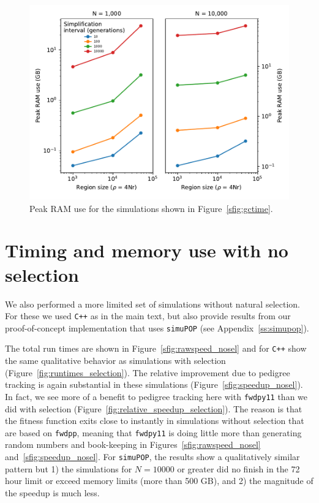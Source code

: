 \documentclass{article}
\newcommand{\simupop}{\texttt{simuPOP}}
\newcommand{\fwdpp}{\texttt{fwdpp}}
\newcommand{\fwdpy}{\texttt{fwdpy11}}
\newcommand{\cpp}{\texttt{C++}}
\begin{document}
\begin{figure}[!h]
    \includegraphics{sims/gc_interval/GCmem}
    \caption{\label{sfig:gcmem}Peak RAM use for the simulations shown in Figure~\ref{sfig:gctime}.}
\end{figure}

\newpage
\section{Timing and memory use with no selection}
\label{ss:timing_nosel}
\renewcommand{\thefigure}{D\arabic{figure}}
\setcounter{figure}{0}

We also performed a more limited set of simulations without natural selection.
For these we used \cpp{} as in the main text, but also provide results from our
proof-of-concept implementation that uses \simupop{} (see
Appendix~\ref{ss:simupop}).

The total run times are shown in
Figure~\ref{sfig:rawspeed_nosel} and for \cpp{} show the same qualitative behavior as simulations with selection
(Figure~\ref{fig:runtimes_selection}).  The relative improvement due to pedigree tracking is again substantial in these
simulations (Figure~\ref{sfig:speedup_nosel}).  In fact, we see more of a benefit to pedigree tracking here with \fwdpy{}
than we did with selection (Figure~\ref{fig:relative_speedup_selection}).  The reason is that the fitness function exits
close to instantly in simulations without selection that are based on \fwdpp{}, meaning that \fwdpy{} is doing little
more than generating random numbers and book-keeping in Figures~\ref{sfig:rawspeed_nosel}
and~\ref{sfig:speedup_nosel}.
For \simupop{}, the results show a qualitatively similar pattern but 1) the
simulations for $N = 10000$ or greater did no finish in the 72 hour limit or
exceed memory limits (more than 500 GB), and 2) the magnitude of the speedup is
much less.
\end{document}
